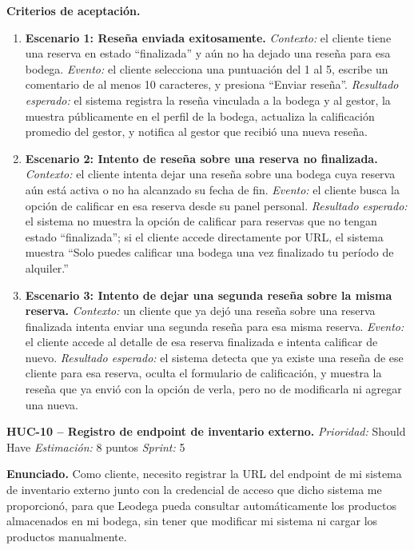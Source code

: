 \textbf{Criterios de aceptación.}
\begin{enumerate}
\item \textbf{Escenario 1: Reseña enviada exitosamente.} \textit{Contexto:} el cliente tiene una reserva en estado ``finalizada'' y aún no ha dejado una reseña para esa bodega. \textit{Evento:} el cliente selecciona una puntuación del 1 al 5, escribe un comentario de al menos 10 caracteres, y presiona ``Enviar reseña''. \textit{Resultado esperado:} el sistema registra la reseña vinculada a la bodega y al gestor, la muestra públicamente en el perfil de la bodega, actualiza la calificación promedio del gestor, y notifica al gestor que recibió una nueva reseña.
\item \textbf{Escenario 2: Intento de reseña sobre una reserva no finalizada.} \textit{Contexto:} el cliente intenta dejar una reseña sobre una bodega cuya reserva aún está activa o no ha alcanzado su fecha de fin. \textit{Evento:} el cliente busca la opción de calificar en esa reserva desde su panel personal. \textit{Resultado esperado:} el sistema no muestra la opción de calificar para reservas que no tengan estado ``finalizada''; si el cliente accede directamente por URL, el sistema muestra ``Solo puedes calificar una bodega una vez finalizado tu período de alquiler.''
\item \textbf{Escenario 3: Intento de dejar una segunda reseña sobre la misma reserva.} \textit{Contexto:} un cliente que ya dejó una reseña sobre una reserva finalizada intenta enviar una segunda reseña para esa misma reserva. \textit{Evento:} el cliente accede al detalle de esa reserva finalizada e intenta calificar de nuevo. \textit{Resultado esperado:} el sistema detecta que ya existe una reseña de ese cliente para esa reserva, oculta el formulario de calificación, y muestra la reseña que ya envió con la opción de verla, pero no de modificarla ni agregar una nueva.
\end{enumerate}

\textbf{HUC-10 -- Registro de endpoint de inventario externo.} \label{req:HUC-10}
\textit{Prioridad:} Should Have \quad \textit{Estimación:} 8 puntos \quad \textit{Sprint:} 5

\textbf{Enunciado.} Como cliente, necesito registrar la URL del endpoint de mi sistema de inventario externo junto con la credencial de acceso que dicho sistema me proporcionó, para que Leodega pueda consultar automáticamente los productos almacenados en mi bodega, sin tener que modificar mi sistema ni cargar los productos manualmente.

